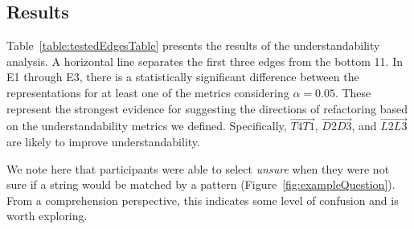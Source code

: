 \subsection{Results}
Table~\ref{table:testedEdgesTable} presents the results of the understandability analysis. A horizontal line separates the first three edges from the bottom 11. In E1 through E3, there is a statistically significant difference between the representations for at least one of the metrics considering $\alpha = 0.05$.  These represent the strongest evidence for suggesting the directions of refactoring based on the understandability metrics we defined. Specifically, $\overrightarrow{T4 T1}$, $\overrightarrow{D2 D3}$, and $\overrightarrow{L2 L3}$
are likely to improve understandability.

We note here that participants were able to select \emph{unsure} when they were not sure if a string would be matched by a pattern (Figure~\ref{fig:exampleQuestion}). From a comprehension perspective, this indicates some level of confusion and is worth exploring. 


